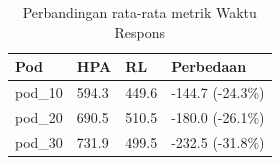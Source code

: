 \begin{table}[ht]
  \centering
  \caption{Perbandingan rata-rata metrik Waktu Respons}\label{tab:deskriptif-response-time}
  \begin{tabular}{llll}
    \toprule
    Pod & HPA & RL & Perbedaan \\
    \midrule
    pod\_10 & 594.3 & 449.6 & -144.7 (-24.3\%) \\
    pod\_20 & 690.5 & 510.5 & -180.0 (-26.1\%) \\
    pod\_30 & 731.9 & 499.5 & -232.5 (-31.8\%) \\
    \bottomrule
  \end{tabular}
\end{table}